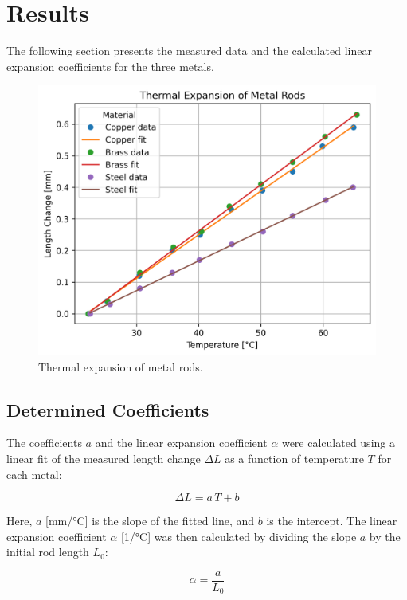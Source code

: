 \documentclass[a4paper,12pt]{article}
\begin{document}
\section{Results}

The following section presents the measured data and the calculated linear expansion coefficients for the three metals.

\begin{figure}[h]
    \centering
    \includegraphics[width=1\textwidth]{expansion_plot.png}
    \caption{Thermal expansion of metal rods.}
    \label{fig:expansion_plot}
\end{figure}

\subsection*{Determined Coefficients}

The coefficients $a$ and the linear expansion coefficient $\alpha$ were calculated using a linear fit of the measured length change $\Delta L$ as a function of temperature $T$ for each metal:

\begin{equation}
    \Delta L = a \, T + b
\end{equation}

Here, $a$ [mm/°C] is the slope of the fitted line, and $b$ is the intercept. The linear expansion coefficient $\alpha$ [1/°C] was then calculated by dividing the slope $a$ by the initial rod length $L_0$:

\begin{equation}
    \alpha = \frac{a}{L_0}
\end{equation}
\end{document}
